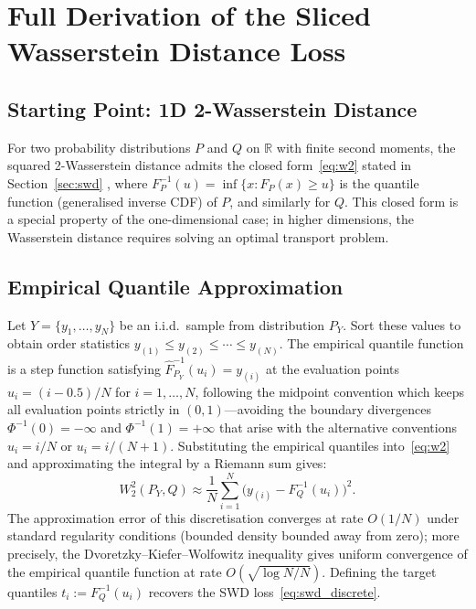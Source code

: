 \documentclass[11pt,a4paper]{article}
\begin{document}




\appendix

\section{Full Derivation of the Sliced Wasserstein Distance Loss}
\label{app:swd_derivation}

\subsection{Starting Point: 1D 2-Wasserstein Distance}

For two probability distributions $P$ and $Q$ on $\mathbb{R}$ with finite second moments, the squared 2-Wasserstein distance admits the closed form~\eqref{eq:w2} stated in Section~\ref{sec:swd} \cite{wasserstein}, where $F_P^{-1}(u) = \inf\{x : F_P(x) \geq u\}$ is the quantile function (generalised inverse CDF) of $P$, and similarly for $Q$.
This closed form is a special property of the one-dimensional case; in higher dimensions, the Wasserstein distance requires solving an optimal transport problem.

\subsection{Empirical Quantile Approximation}

Let $Y = \{y_1, \ldots, y_N\}$ be an i.i.d.\ sample from distribution $P_Y$.
Sort these values to obtain order statistics $y_{(1)} \leq y_{(2)} \leq \cdots \leq y_{(N)}$.
The empirical quantile function is a step function satisfying $\hat{F}_{P_Y}^{-1}(u_i) = y_{(i)}$ at the evaluation points $u_i = (i - 0.5)/N$ for $i = 1, \ldots, N$, following the midpoint convention \cite{blom1958,wilk1968} which keeps all evaluation points strictly in $(0,1)$---avoiding the boundary divergences $\Phi^{-1}(0) = -\infty$ and $\Phi^{-1}(1) = +\infty$ that arise with the alternative conventions $u_i = i/N$ or $u_i = i/(N+1)$.
Substituting the empirical quantiles into~\eqref{eq:w2} and approximating the integral by a Riemann sum gives:
\begin{equation}
\label{eq:w2_empirical}
W_2^2(P_Y, Q) \approx \frac{1}{N} \sum_{i=1}^{N} \bigl(y_{(i)} - F_Q^{-1}(u_i)\bigr)^2.
\end{equation}
The approximation error of this discretisation converges at rate $O(1/N)$ under standard regularity conditions (bounded density bounded away from zero); more precisely, the Dvoretzky--Kiefer--Wolfowitz inequality \cite{dkw1956} gives uniform convergence of the empirical quantile function at rate $O(\sqrt{\log N / N})$.
Defining the target quantiles $t_i := F_Q^{-1}(u_i)$ recovers the SWD loss~\eqref{eq:swd_discrete}.
\end{document}
